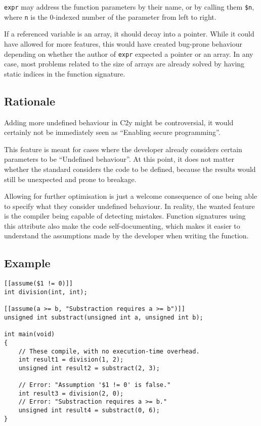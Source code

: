 \documentclass[a4paper, 12pt]{article}
\begin{document}
\texttt{expr} may address the function parameters by their name, or by calling them
\texttt{\$n}, where \texttt{n} is the 0-indexed number of the parameter from left to right.

If a referenced variable is an array, it should decay into a pointer.  While it
could have allowed for more features, this would have created bug-prone behaviour
depending on whether the author of \texttt{expr} expected a pointer or an array.  In any
case, most problems related to the size of arrays are already solved by having
static indices in the function signature.
\subsection{Rationale}
\label{sec:orgf863fb7}
Adding more undefined behaviour in C2y might be controversial, it would certainly
not be immediately seen as ``Enabling secure programming''.

This feature is meant for cases where the developer already considers certain
parameters to be ``Undefined behaviour''.  At this point, it does not matter
whether the standard considers the code to be defined, because the results would
still be unexpected and prone to breakage.

Allowing for further optimisation is just a welcome consequence of one being able
to specify what they consider undefined behaviour.  In reality, the wanted feature is the compiler
being capable of detecting mistakes.  Function signatures using this attribute also
make the code self-documenting, which makes it easier to understand the assumptions made by the developer
when writing the function.

\pagebreak
\subsection{Example}
\label{sec:orgb0a26d0}
\begin{verbatim}
[[assume($1 != 0)]]
int division(int, int);

[[assume(a >= b, "Substraction requires a >= b")]]
unsigned int substract(unsigned int a, unsigned int b);

int main(void)
{
    // These compile, with no execution-time overhead.
    int result1 = division(1, 2);
    unsigned int result2 = substract(2, 3);

    // Error: "Assumption '$1 != 0' is false."
    int result3 = division(2, 0);
    // Error: "Substraction requires a >= b."
    unsigned int result4 = substract(0, 6);
}
\end{verbatim}
\end{document}
